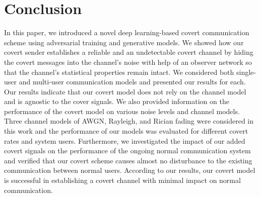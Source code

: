 \section{Conclusion}
\label{s:conc}
In this paper, we introduced a novel deep learning-based covert communication scheme using adversarial training and generative models. We showed how our covert sender establishes a reliable and an undetectable covert channel by hiding the covert messages into the channel's noise with help of an observer network so that the channel's statistical properties remain intact. We considered both single-user and multi-user communication models and presented our results for each. Our results indicate that our covert model does not rely on the channel model and is agnostic to the cover signals. We also provided information on the performance of the covert model on various noise levels and channel models. Three channel models of AWGN, Rayleigh, and Rician fading were considered in this work and the performance of our models was evaluated for different covert rates and system users. Furthermore, we investigated the impact of our added covert signals on the performance of the ongoing normal communication system and verified that our covert scheme causes almost no disturbance to the existing communication between normal users. According to our results, our covert model is successful in establishing a covert channel with minimal impact on normal communication.
